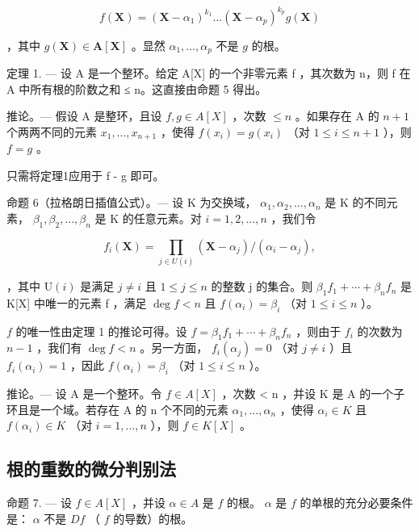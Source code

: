 \[
f (\mathbf {X}) = \left(\mathbf {X} - \alpha_ {1}\right) ^ {k _ {1}} \dots \left(\mathbf {X} - \alpha_ {p}\right) ^ {k _ {p}} g (\mathbf {X})
\]

，其中 \(g(\mathbf{X}) \in \mathbf{A}[\mathbf{X}]\) 。显然 \(\alpha_1, \ldots, \alpha_p\) 不是 \(g\) 的根。

定理 1. --- 设 A 是一个整环。给定 A{[}X{]} 的一个非零元素 f ，其次数为 n，则 f 在 A 中所有根的阶数之和 ≤ n。这直接由命题 5 得出。

推论。--- 假设 A 是整环，且设 \(f, g \in A[X]\) ，次数 \(\leqslant n\) 。如果存在 A 的 \(n+1\) 个两两不同的元素 \(x_{1}, \ldots, x_{n+1}\) ，使得 \(f(x_{i}) = g(x_{i})\) （对 \(1 \leqslant i \leqslant n+1\) ），则 \(f = g\) 。

只需将定理1应用于 f - g 即可。

命题 6（拉格朗日插值公式）。--- 设 K 为交换域， \(\alpha_{1}, \alpha_{2}, \ldots, \alpha_{n}\) 是 K 的不同元素， \(\beta_{1}, \beta_{2}, \ldots, \beta_{n}\) 是 K 的任意元素。对 \(i = 1, 2, \ldots, n\) ，我们令

\[
f _ {i} (\mathbf {X}) = \prod_ {j \in U (i)} \left(\mathbf {X} - \alpha_ {j}\right) / \left(\alpha_ {i} - \alpha_ {j}\right),
\]

，其中 \(\mathrm{U}(i)\) 是满足 \(j \neq i\) 且 \(1 \leqslant j \leqslant n\) 的整数 j 的集合。则 \(\beta_{1}f_{1} + \cdots + \beta_{n}f_{n}\) 是 K{[}X{]} 中唯一的元素 f ，满足 \(\deg f < n\) 且 \(f(\alpha_{i}) = \beta_{i}\) （对 \(1 \leqslant i \leqslant n\) ）。

\(f\) 的唯一性由定理 1 的推论可得。设 \(f = \beta_{1}f_{1} + \cdots + \beta_{n}f_{n}\) ，则由于 \(f_{i}\) 的次数为 \(n - 1\) ，我们有 \(\deg f < n\) 。另一方面， \(f_{i}(\alpha_{j}) = 0\) （对 \(j \neq i\) ）且 \(f_{i}(\alpha_{i}) = 1\) ，因此 \(f(\alpha_{i}) = \beta_{i}\) （对 \(1 \leqslant i \leqslant n\) ）。

推论。--- 设 A 是一个整环。令 \(f \in A[X]\) ，次数 \textless{} n ，并设 K 是 A 的一个子环且是一个域。若存在 A 的 n 个不同的元素 \(\alpha_{1}, \ldots, \alpha_{n}\) ，使得 \(\alpha_{i} \in K\) 且 \(f(\alpha_{i}) \in K\) （对 \(i = 1, \ldots, n\) ），则 \(f \in K[X]\) 。

\subsection{根的重数的微分判别法}

命题 7. --- 设 \(f \in A[X]\) ，并设 \(\alpha \in A\) 是 \(f\) 的根。 \(\alpha\) 是 \(f\) 的单根的充分必要条件是： \(\alpha\) 不是 \(Df\) （ \(f\) 的导数）的根。

